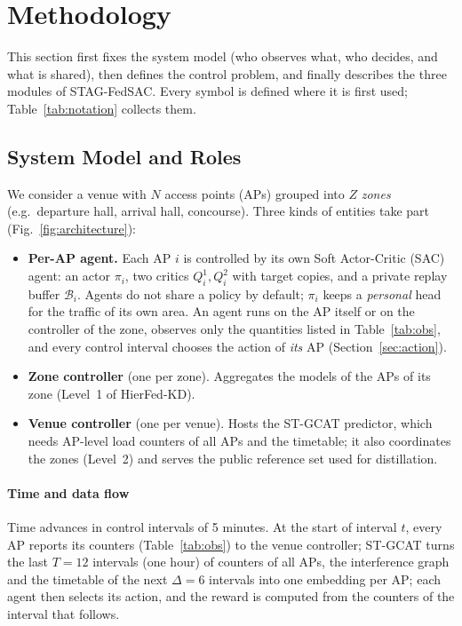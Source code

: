 \section{Methodology}
\label{sec:method}

This section first fixes the system model (who observes what, who decides, and what is shared), then defines the control problem, and finally describes the three modules of STAG-FedSAC. Every symbol is defined where it is first used; Table~\ref{tab:notation} collects them.

\subsection{System Model and Roles}
\label{sec:roles}

We consider a venue with $N$ access points (APs) grouped into $Z$ \emph{zones} (e.g.\ departure hall, arrival hall, concourse). Three kinds of entities take part (Fig.~\ref{fig:architecture}):

\begin{itemize}
  \item \textbf{Per-AP agent.} Each AP $i$ is controlled by its own Soft Actor-Critic (SAC) agent: an actor $\pi_i$, two critics $Q_i^{1},Q_i^{2}$ with target copies, and a private replay buffer $\mathcal{B}_i$. Agents do not share a policy by default; $\pi_i$ keeps a \emph{personal} head for the traffic of its own area. An agent runs on the AP itself or on the controller of the zone, observes only the quantities listed in Table~\ref{tab:obs}, and every control interval chooses the action of \emph{its} AP (Section~\ref{sec:action}).
  \item \textbf{Zone controller} (one per zone). Aggregates the models of the APs of its zone (Level~1 of HierFed-KD).
  \item \textbf{Venue controller} (one per venue). Hosts the ST-GCAT predictor, which needs AP-level load counters of all APs and the timetable; it also coordinates the zones (Level~2) and serves the public reference set used for distillation.
\end{itemize}

\paragraph{Time and data flow} Time advances in control intervals of 5 minutes. At the start of interval $t$, every AP reports its counters (Table~\ref{tab:obs}) to the venue controller; ST-GCAT turns the last $T=12$ intervals (one hour) of counters of all APs, the interference graph and the timetable of the next $\Delta=6$ intervals into one embedding per AP; each agent then selects its action, and the reward is computed from the counters of the interval that follows.

